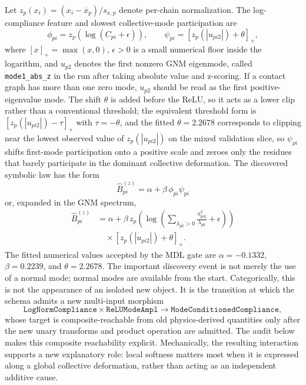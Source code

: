 \documentclass[11pt]{article}
\theoremstyle{definition}
\begin{document}
Let $z_p(x_i)=(x_i-\overline{x}_p)/s_{x,p}$ denote per-chain normalization. The log-compliance feature and slowest collective-mode participation are
\[
\phi_{pi}=z_p\!\left(\log(C_{pi}+\epsilon)\right),
\qquad
\psi_{pi}=\left[z_p\!\left(|u_{pi2}|\right)+\theta\right]_+ ,
\]
where $[x]_+=\max(x,0)$, $\epsilon>0$ is a small numerical floor inside the logarithm, and $u_{p2}$ denotes the first nonzero GNM eigenmode, called \texttt{mode1\_abs\_z} in the run after taking absolute value and z-scoring. If a contact graph has more than one zero mode, $u_{p2}$ should be read as the first positive-eigenvalue mode. The shift $\theta$ is added before the ReLU, so it acts as a lower clip rather than a conventional threshold; the equivalent threshold form is $[z_p(|u_{pi2}|)-\tau]_+$ with $\tau=-\theta$, and the fitted $\theta=2.2678$ corresponds to clipping near the lowest observed value of $z_p(|u_{pi2}|)$ on the mixed validation slice, so $\psi_{pi}$ shifts first-mode participation onto a positive scale and zeroes only the residues that barely participate in the dominant collective deformation. The discovered symbolic law has the form
\begin{equation}
\boxed{
\widehat B^{(z)}_{pi}
=\alpha+\beta\,\phi_{pi}\psi_{pi}
}
\label{eq:bfactor_symbolic_form}
\end{equation}
or, expanded in the GNM spectrum,
\begin{equation}
\boxed{
\begin{aligned}
\widehat B^{(z)}_{pi}
&=\alpha+\beta\,
z_p\!\left(
\log\!\left(\sum_{\lambda_{pk}>0}\frac{u_{pik}^2}{\lambda_{pk}}+\epsilon\right)
\right)\\
&\quad{}\times
\left[z_p\!\left(|u_{pi2}|\right)+\theta\right]_+ .
\end{aligned}
}
\label{eq:bfactor_spectral_form}
\end{equation}
The fitted numerical values accepted by the MDL gate are $\alpha=-0.1332$, 
$\beta=0.2239$, and $\theta=2.2678$.
The important discovery event is not merely the use of a normal mode; normal modes are available from the start. Categorically, this is not the appearance of an isolated new object. It is the transition at which the schema admits a new multi-input morphism
\[
\texttt{LogNormCompliance}\times \texttt{ReLUModeAmpl}
\longrightarrow
\texttt{ModeConditionedCompliance},
\]
whose target is composite-reachable from old physics-derived quantities only after the new unary transforms and product operation are admitted. The audit below makes this composite reachability explicit. Mechanically, the resulting interaction supports a new explanatory role: local softness matters most when it is expressed along a global collective deformation, rather than acting as an independent additive cause.
\end{document}
